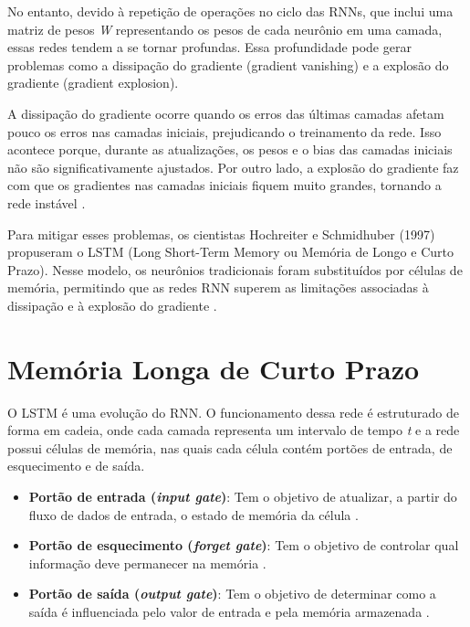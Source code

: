 No entanto, devido à repetição de operações no ciclo das RNNs, que inclui uma matriz de pesos 
\textit{W} representando os pesos de cada neurônio em uma camada, essas redes tendem a se tornar profundas. Essa profundidade pode gerar problemas como a dissipação do gradiente (gradient vanishing) e a explosão do gradiente (gradient explosion).

A dissipação do gradiente ocorre quando os erros das últimas camadas afetam pouco os erros nas camadas iniciais, prejudicando o treinamento da rede. Isso acontece porque, durante as atualizações, os pesos e o bias das camadas iniciais não são significativamente ajustados. Por outro lado, a explosão do gradiente faz com que os gradientes nas camadas iniciais fiquem muito grandes, tornando a rede instável \cite{goodfellow2016}.

Para mitigar esses problemas, os cientistas Hochreiter e Schmidhuber (1997) propuseram o LSTM (Long Short-Term Memory ou Memória de Longo e Curto Prazo). Nesse modelo, os neurônios tradicionais foram substituídos por células de memória, permitindo que as redes RNN superem as limitações associadas à dissipação e à explosão do gradiente \cite{hochreiter1997}.


\section {Memória Longa de Curto Prazo}

O LSTM é uma evolução do RNN. O funcionamento dessa rede é estruturado de forma em cadeia, onde cada camada representa um intervalo de tempo \textit{t} e a rede possui células de memória, nas quais cada célula contém portões de entrada, de esquecimento e de saída.

\begin{itemize}
    \item \textbf{Portão de entrada (\textit{input gate})}: Tem o objetivo de atualizar, a partir do fluxo de dados de entrada, o estado de memória da célula \cite{abdelnasser2019}.
    
    \item \textbf{Portão de esquecimento (\textit{forget gate})}: Tem o objetivo de controlar qual informação deve permanecer na memória \cite{abdelnasser2019}.
    
    \item \textbf{Portão de saída (\textit{output gate})}: Tem o objetivo de determinar como a saída é influenciada pelo valor de entrada e pela memória armazenada \cite{abdelnasser2019}.
\end{itemize}

